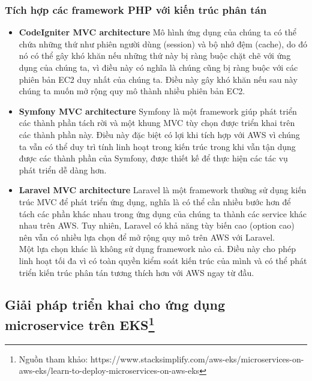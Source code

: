 \subsubsection{Tích hợp các framework PHP với kiến trúc phân tán}
    \begin{itemize}
        \item \textbf{CodeIgniter MVC architecture}
        \newline
        Mô hình ứng dụng của chúng ta có thể chứa những thứ như phiên người dùng (session) và bộ nhớ đệm (cache), do đó nó có thể gây khó khăn nếu những thứ này bị ràng buộc chặt chẽ với ứng dụng của chúng ta, vì điều này có nghĩa là chúng cũng bị ràng buộc với các phiên bản EC2 duy nhất của chúng ta. Điều này gây khó khăn nếu sau này chúng ta muốn mở rộng quy mô thành nhiều phiên bản EC2.
        \item \textbf{Symfony MVC architecture}
        \newline
        Symfony là một framework giúp phát triển các thành phần tách rời và một khung MVC tùy chọn được triển khai trên các thành phần này. Điều này đặc biệt có lợi khi tích hợp với AWS vì chúng ta vẫn có thể duy trì tính linh hoạt trong kiến trúc trong khi vẫn tận dụng được các thành phần của Symfony, được thiết kế để thực hiện các tác vụ phát triển dễ dàng hơn.
        \item \textbf{Laravel MVC architecture}
        \newline
        Laravel là một framework thường sử dụng kiến trúc MVC để phát triển ứng dụng, nghĩa là có thể cần nhiều bước hơn để tách các phần khác nhau trong ứng dụng của chúng ta thành các service khác nhau trên AWS. Tuy nhiên, Laravel có khả năng tùy biến cao (option cao) nên vẫn có nhiều lựa chọn để mở rộng quy mô trên AWS với Laravel.\\[0.5cm]
        Một lựa chọn khác là không sử dụng framework nào cả. Điều này cho phép linh hoạt tối đa vì có toàn quyền kiểm soát kiến trúc của mình và có thể phát triển kiến trúc phân tán tương thích hơn với AWS ngay từ đầu.
    \end{itemize}
\subsection{Giải pháp triển khai cho ứng dụng microservice trên EKS\protect\footnote{Nguồn tham khảo: https://www.stacksimplify.com/aws-eks/microservices-on-aws-eks/learn-to-deploy-microservices-on-aws-eks}}

